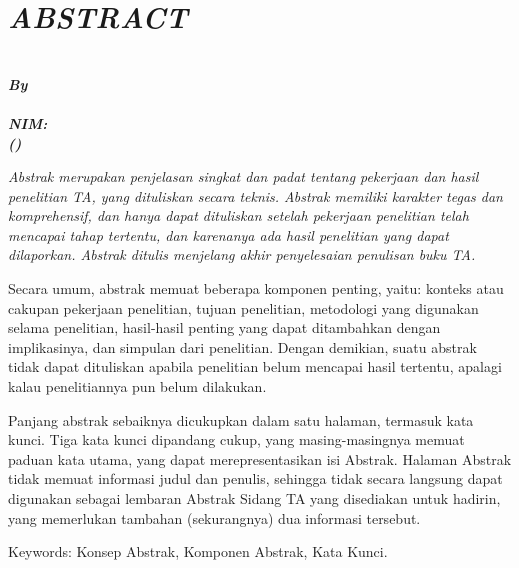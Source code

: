 \chapter{\itshape ABSTRACT}
\label{chp:abstract}
\vspace{\baselineskip}
\begin{center}
  \bfseries\large\itshape
  \MakeUppercase{\titlename} \\
  \vspace{1\baselineskip}
  \normalsize\normalfont\itshape By \\
  \bfseries\large\normalfont \authorname \\
  NIM: \authorid \\
  (\itshape\department) \\
\end{center}
\itshape
\vspace{2\baselineskip} \noindent
Abstrak merupakan penjelasan singkat dan padat tentang pekerjaan dan hasil penelitian TA, yang dituliskan secara teknis. Abstrak memiliki karakter tegas dan komprehensif, dan hanya dapat dituliskan setelah pekerjaan penelitian telah mencapai tahap tertentu, dan karenanya ada hasil penelitian yang dapat dilaporkan. Abstrak ditulis menjelang akhir penyelesaian penulisan buku TA.
\vspace{\baselineskip}

\noindent
Secara umum, abstrak memuat beberapa komponen penting, yaitu: konteks atau cakupan pekerjaan penelitian, tujuan penelitian, metodologi yang digunakan selama penelitian, hasil-hasil penting yang dapat ditambahkan dengan implikasinya, dan simpulan dari penelitian. Dengan demikian, suatu abstrak tidak dapat dituliskan apabila penelitian belum mencapai hasil tertentu, apalagi kalau penelitiannya pun belum dilakukan.
\vspace{\baselineskip}

\noindent
Panjang abstrak sebaiknya dicukupkan dalam satu halaman, termasuk kata kunci. Tiga kata kunci dipandang cukup, yang masing-masingnya memuat paduan kata utama, yang dapat merepresentasikan isi Abstrak. Halaman Abstrak tidak memuat informasi judul dan penulis, sehingga tidak secara langsung dapat digunakan sebagai lembaran Abstrak Sidang TA yang disediakan untuk hadirin, yang memerlukan tambahan (sekurangnya) dua informasi tersebut.

\begin{flushleft}
  Keywords: Konsep Abstrak, Komponen Abstrak, Kata Kunci.
\end{flushleft}\normalfont